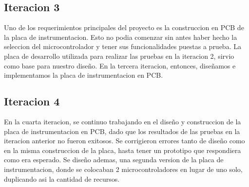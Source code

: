 
\subsection{Iteracion 3} %
\label{sub:iteracion_3}

Uno de los requerimientos principales del proyecto es la construccion en PCB de la placa de instrumentacion. Esto no podia comenzar sin antes haber hecho la seleccion del microcontrolador y tener sus funcionalidades puestas a prueba. La placa de desarrollo utilizada para realizar las pruebas en la iteracion 2, sirvio como base para nuestro diseño. En la tercera iteracion, entonces, diseñamos e implementamos la placa de instrumentacion en PCB.

\subsection{Iteracion 4} %
\label{sub:iteracion_4}

En la cuarta iteracion, se continuo trabajando en el diseño y construccion de la placa de instrumentacion en PCB, dado que los resultados de las pruebas en la iteracion anterior no fueron exitosos. Se corrigieron errores tanto de diseño como en la misma construccion de la placa, hasta tener un prototipo que respondiera como era esperado.
Se diseño ademas, una segunda version de la placa de instrumentacion, donde se colocaban 2 microcontroladores en lugar de uno solo, duplicando asi la cantidad de recursos. 

